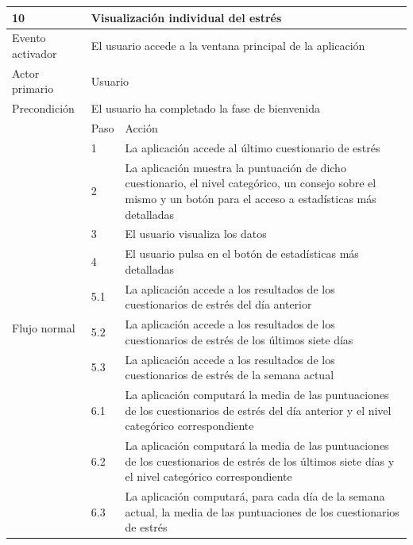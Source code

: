     \begin{table}[h]
        \centering
        \begin{tabularx}{\textwidth}{|l|l|X|}
            \hline
            10 & \multicolumn{2}{|X|}{Visualización individual del estrés} \\
            \hline
            Evento activador & \multicolumn{2}{|X|}{El usuario accede a la ventana principal de la aplicación} \\
            \hline
            Actor primario & \multicolumn{2}{|X|}{Usuario} \\
            \hline
            Precondición & \multicolumn{2}{|X|}{El usuario ha completado la fase de bienvenida} \\
            \hline
            \multirow{13}{*}{Flujo normal} & Paso & Acción \\
            \cline{2-3} & 1 & La aplicación accede al último cuestionario de estrés \\
            \cline{2-3} & 2 & La aplicación muestra la puntuación de dicho cuestionario, el nivel categórico, un consejo sobre el mismo y un botón para el acceso a estadísticas más detalladas \\
            \cline{2-3} & 3 & El usuario visualiza los datos \\
            \cline{2-3} & 4 & El usuario pulsa en el botón de estadísticas más detalladas \\
            \cline{2-3} & 5.1 & La aplicación accede a los resultados de los cuestionarios de estrés del día anterior \\
            \cline{2-3} & 5.2 & La aplicación accede a los resultados de los cuestionarios de estrés de los últimos siete días \\
            \cline{2-3} & 5.3 & La aplicación accede a los resultados de los cuestionarios de estrés de la semana actual \\
            \cline{2-3} & 6.1 & La aplicación computará la media de las puntuaciones de los cuestionarios de estrés del día anterior y el nivel categórico correspondiente \\
            \cline{2-3} & 6.2 & La aplicación computará la media de las puntuaciones de los cuestionarios de estrés de los últimos siete días y el nivel categórico correspondiente \\
            \cline{2-3} & 6.3 & La aplicación computará, para cada día de la semana actual, la media de las puntuaciones de los cuestionarios de estrés \\

\end{tabularx}
\end{table}
